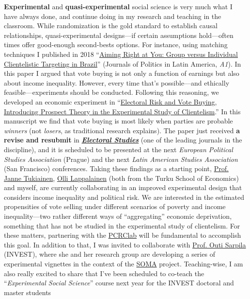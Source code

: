 \documentclass[10pt,stdletter,dateno,sigleft]{newlfm} %
\begin{document}
\begin{newlfm}
{\bf Experimental} and {\bf quasi-experimental} social science is very much what I have always done, and continue doing in my research and teaching in the classroom. While randomization is the gold standard to establish causal relationships, quasi-experimental designs---if certain assumptions hold---often times offer good-enough second-bests options. For instance, using matching techniques I published in 2018 ``\href{https://journals.sub.uni-hamburg.de/giga/jpla/article/view/1121/1128}{Aiming Right at You: Group versus Individual Clientelistic Targeting in Brazil}'' (Journals of Politics in Latin America, \emph{A1}). In this paper I argued that vote buying is not only a function of earnings but also about income inequality. However, every time that's possible---and ethically feasible---experiments should be conducted. Following this reasoning, we developed an economic experiment in ``\href{https://github.com/hbahamonde/Economic_Experiment_Vote_Selling/raw/master/Vote_Selling_Bahamonde_Canales_Paper.pdf}{Electoral Risk and Vote Buying, Introducing Prospect Theory in the Experimental Study of Clientelism}.'' In this manuscript we find that vote buying is most likely when parties are probable \emph{winners} (not \emph{losers}, as traditional research explains). The paper just received  {\bf a revise and resubmit} in {\bf \underline{\emph{Electoral Studies}}} (one of the leading journals in the discipline), and it is scheduled to be presented at the next \emph{European Political Studies Association} (Prague) and the next \emph{Latin American Studies Association} (San Francisco) conferences. Taking these findings as a starting point, \href{https://www.utu.fi/en/people/janne-tukiainen}{Prof. Janne Tukiainen}, \href{https://www.utu.fi/en/people/olli-lappalainen}{Olli Lappalainen} (both from the Turku School of Economics) and myself, are currently collaborating in an improved experimental design that considers income inequality and political risk. We are interested in the estimated propensities of vote selling under different scenarios of poverty and income inequality---two rather different ways of ``aggregating'' economic deprivation, something that has not be studied in the experimental study of clientelism. For these matters, partnering with the \href{https://pcrclab.utu.fi/?page_id=894&lang=en}{PCRClab} will be fundamental to accomplish this goal. In addition to that, I was invited to collaborate with \href{https://www.utu.fi/en/people/outi-sarpila}{Prof. Outi Sarpila} (INVEST), where she and her research group are developing a series of experimental vignettes in the context of the \href{https://soma.utu.fi}{SOMA} project. Teaching-wise, I am also really excited to share that I've been scheduled to co-teach the ``\emph{Experimental Social Science}'' course next year for the INVEST doctoral and master students


\end{newlfm}
\end{document}
